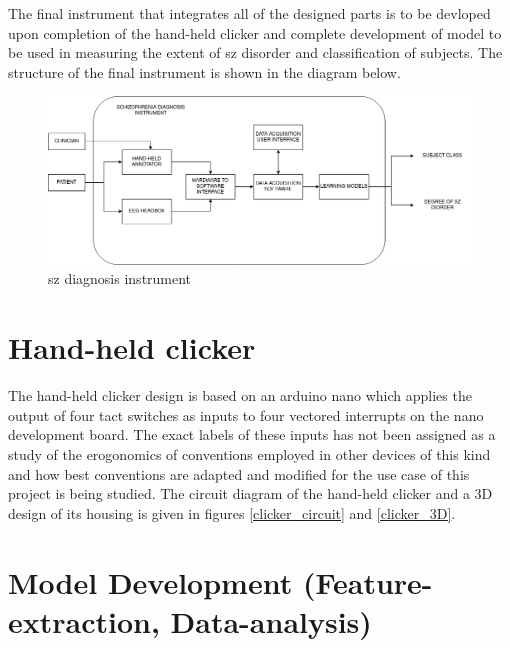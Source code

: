 \documentclass[10pt]{article}
\begin{document}
The final instrument that integrates all of the designed parts is to be devloped upon 
completion of the hand-held clicker and complete development of model to be used in 
measuring the extent of \gls{sz} disorder and classification of subjects. The structure 
of the final instrument is shown in the diagram below.
\begin{figure}[H]
  \includegraphics[width=16cm]{../../../images/technical/instrumet.png}
  \caption{\gls{sz} diagnosis instrument}\label{instrument}
\end{figure}


\section{Hand-held clicker}
The hand-held clicker design is based on an arduino nano which applies the output of four 
tact switches as inputs to four vectored interrupts on the nano development board. The 
exact labels of these inputs has not been assigned as a study of the erogonomics of 
conventions employed in other devices of this kind and how best conventions are adapted and 
modified for the use case of this project is being studied. The circuit diagram of the 
hand-held clicker and a 3D design of its housing is given in figures \ref{clicker_circuit} 
and \ref{clicker_3D}.

\section{Model Development (Feature-extraction, Data-analysis)}
\end{document}
